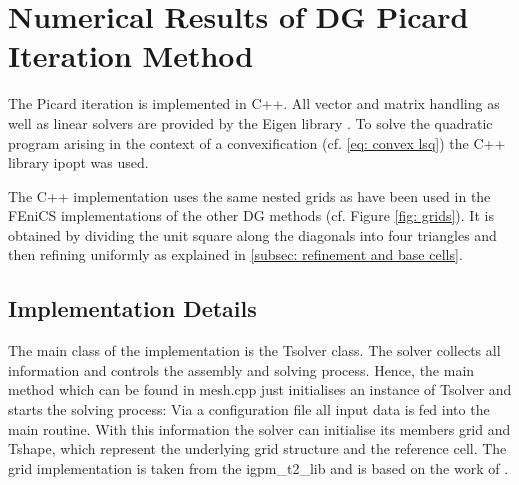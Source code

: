 
\newpage

\section{Numerical Results of DG Picard Iteration Method} \label{sec: numerical results our Method}

The Picard iteration is implemented in C++. All vector and matrix handling as well as linear solvers are provided by the Eigen library \cite{eigenweb}. To solve the quadratic program arising in the context of a convexification (cf. \eqref{eq: convex lsq}) the C++ library ipopt \cite{ipopt} was used.

The C++ implementation uses the same nested grids as have been used in the FEniCS implementations of the other DG methods (cf. Figure \ref{fig: grids}). It is obtained by dividing the unit square along the diagonals into four triangles and then refining uniformly as explained in \ref{subsec: refinement and base cells}.

\subsection{Implementation Details}

The main class of the implementation is the Tsolver class. The solver collects all information and controls the assembly and solving process.
Hence, the main method which can be found in mesh.cpp just initialises an instance of Tsolver and starts the solving process: Via a configuration file all input data is fed into the main routine. With this information the solver can initialise its members grid and Tshape, which represent the underlying grid structure and the reference cell. 
The grid implementation is taken from the igpm\_t2\_lib and is based on the work of \cite{BMV2009}.

